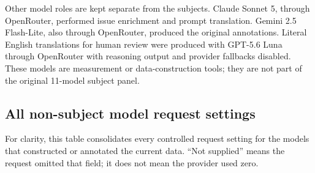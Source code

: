 \documentclass[11pt]{article}
\begin{document}
Other model roles are kept separate from the subjects. Claude Sonnet 5, through
OpenRouter, performed issue enrichment and prompt translation. Gemini 2.5
Flash-Lite, also through OpenRouter, produced the original annotations. Literal
English translations for human review were produced with GPT-5.6 Luna through
OpenRouter with reasoning output and provider fallbacks disabled. These models
are measurement or data-construction tools; they are not part of the original 11-model
subject panel.

\subsection{All non-subject model request settings}

For clarity, this table consolidates every controlled request setting for the
models that constructed or annotated the current data. ``Not supplied'' means
the request omitted that field; it does not mean the provider used zero.
\end{document}

